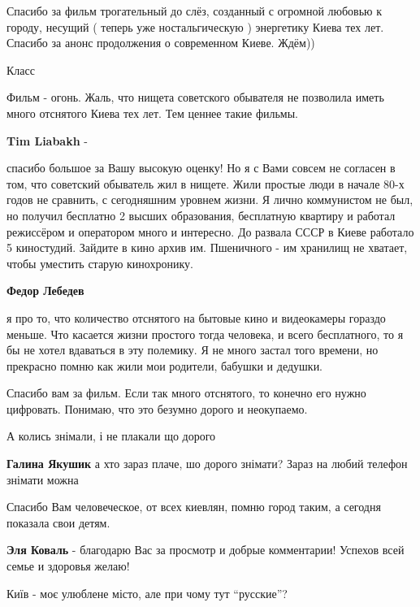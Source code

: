 \begin{itemize}

Спасибо за фильм трогательный до слёз, созданный с огромной любовью к городу,
несущий ( теперь уже ностальгическую ) энергетику Киева тех лет. Спасибо за
анонс продолжения о современном Киеве. Ждём))

Класс


Фильм - огонь. Жаль, что нищета советского обывателя не позволила иметь много
отснятого Киева тех лет. Тем ценнее такие фильмы.

\begin{itemize} %
\textbf{Tim Liabakh} - 

спасибо большое за Вашу высокую оценку! Но я с Вами совсем не согласен в том,
что советский обыватель жил в нищете. Жили простые люди в начале 80-х годов не
сравнить, с сегодняшним уровнем жизни. Я лично коммунистом не был, но получил
бесплатно 2 высших образования, бесплатную квартиру и работал режиссёром и
оператором много и интересно. До развала СССР в Киеве работало 5 киностудий.
Зайдите в кино архив им. Пшеничного - им хранилищ не хватает, чтобы уместить
старую кинохронику.

\textbf{Федор Лебедев} 

я про то, что количество отснятого на бытовые кино и видеокамеры гораздо
меньше. Что касается жизни простого тогда человека, и всего бесплатного, то я
бы не хотел вдаваться в эту полемику. Я не много застал того времени, но
прекрасно помню как жили мои родители, бабушки и дедушки.

Спасибо вам за фильм. Если так много отснятого, то конечно его нужно цифровать.
Понимаю, что это безумно дорого и неокупаемо.

А колись знімали, і не плакали що дорого

\textbf{Галина Якушик} а хто зараз плаче, шо дорого знімати? Зараз на любий телефон знімати можна
\end{itemize} %

Спасибо Вам человеческое, от всех киевлян, помню город таким, а сегодня
показала свои детям.

\textbf{Эля Коваль} - благодарю Вас за просмотр и добрые комментарии! Успехов всей семье и здоровья желаю!

Київ - моє улюблене місто, але при чому тут \enquote{русские}?


\end{itemize}
